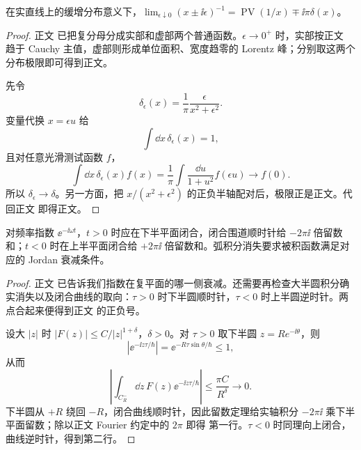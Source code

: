 \begin{theorem}
在实直线上的缓增分布意义下，$\lim_{\epsilon\downarrow0}(x\pm\ii\epsilon)^{-1}=\operatorname{PV}(1/x)\mp\ii\pi\delta(x)$。
\end{theorem}
\begin{proof}
正文 已把复分母分成实部和虚部两个普通函数。$\epsilon\to0^+$ 时，实部按正文 趋于 Cauchy 主值，虚部则形成单位面积、宽度趋零的 Lorentz 峰；分别取这两个分布极限即可得到正文。

先令
\begin{equation*}
 \delta_\epsilon(x)
 =\frac1\pi\frac{\epsilon}{x^2+\epsilon^2}.
\end{equation*}
变量代换 $x=\epsilon u$ 给
\begin{equation*}
 \int\dd x\,\delta_\epsilon(x)=1,
\end{equation*}
且对任意光滑测试函数 $f$，
\begin{equation*}
 \int\dd x\,\delta_\epsilon(x)f(x)
 =\frac1\pi\int\frac{\dd u}{1+u^2}f(\epsilon u)
 \longrightarrow f(0).
\end{equation*}
所以 $\delta_\epsilon\to\delta$。另一方面，把
$x/(x^2+\epsilon^2)$ 的正负半轴配对后，极限正是正文。代回正文 即得正文。
\end{proof}

\begin{proposition}[指数核围道的方向与留数]
对频率指数 $\ee^{-\ii\omega t}$，$t>0$ 时应在下半平面闭合，闭合围道顺时针给 $-2\pi\ii$ 倍留数和；$t<0$ 时在上半平面闭合给 $+2\pi\ii$ 倍留数和。弧积分消失要求被积函数满足对应的 Jordan 衰减条件。
\end{proposition}
\begin{proof}
正文 已告诉我们指数在复平面的哪一侧衰减。还需要再检查大半圆积分确实消失以及闭合曲线的取向：$\tau>0$ 时下半圆顺时针，$\tau<0$ 时上半圆逆时针。两点合起来便得到正文 的正负号。

设大 $|z|$ 时 $|F(z)|\le C/|z|^{1+\delta}$，$\delta>0$。对 $\tau>0$ 取下半圆 $z=Re^{-\ii\theta}$，则
\begin{equation*}
 |\ee^{-\ii z\tau/\hbar}|=\ee^{-R\tau\sin\theta/\hbar}\le1,
\end{equation*}
从而
\begin{equation*}
 \left|\int_{C_R^-}\dd z\,F(z)\ee^{-\ii z\tau/\hbar}\right|
 \le\frac{\pi C}{R^\delta}\to0.
\end{equation*}
下半圆从 $+R$ 绕回 $-R$，闭合曲线顺时针，因此留数定理给实轴积分
$-2\pi\ii$ 乘下半平面留数；除以正文 Fourier 约定中的 $2\pi$ 即得 第一行。$\tau<0$ 时同理向上闭合，曲线逆时针，得到第二行。
\end{proof}
